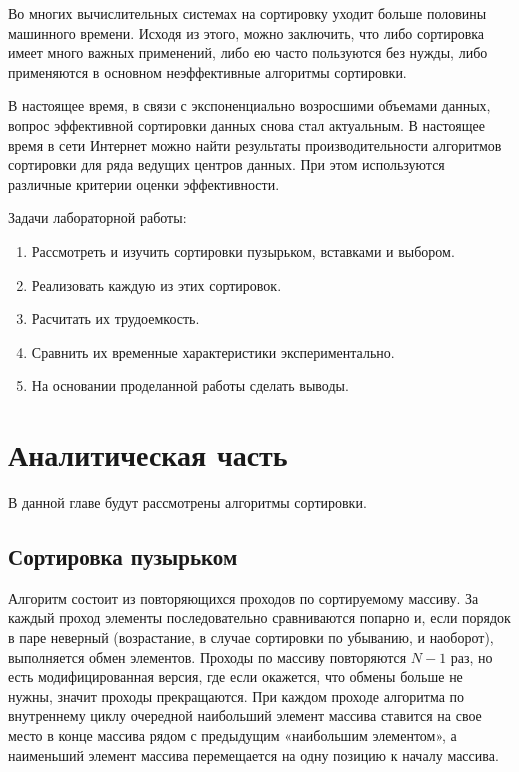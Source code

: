 \documentclass[a4paper,14pt, unknownkeysallowed]{extreport}
\begin{document}
Во многих вычислительных системах на сортировку уходит больше половины машинного времени. Исходя из этого, можно заключить, что либо сортировка имеет много важных применений, либо ею часто пользуются без нужды, либо применяются в основном неэффективные алгоритмы сортировки.

В настоящее время, в связи с экспоненциально возросшими объемами данных, вопрос эффективной сортировки данных снова стал актуальным. В настоящее время в сети Интернет можно найти результаты производительности алгоритмов сортировки для ряда ведущих центров данных.
При этом используются различные критерии оценки эффективности. 

Задачи лабораторной работы:

\begin{enumerate}
    \item Рассмотреть и изучить сортировки пузырьком, вставками и выбором.
    \item Реализовать каждую из этих сортировок.
    \item Расчитать их трудоемкость.
    \item Сравнить их временные характеристики экспериментально.
    \item На основании проделанной работы сделать выводы.
\end{enumerate}

\chapter{Аналитическая часть}
В данной главе будут рассмотрены алгоритмы сортировки.

\section{Сортировка пузырьком}


Алгоритм состоит из повторяющихся проходов по сортируемому массиву. За каждый проход элементы последовательно сравниваются попарно и, если порядок в паре неверный (возрастание, в случае сортировки по убыванию, и наоборот), выполняется обмен элементов. Проходы по массиву повторяются $N - 1$ раз, но есть модифицированная версия, где если окажется, что обмены больше не нужны, значит проходы прекращаются. При каждом проходе алгоритма по внутреннему циклу очередной наибольший элемент массива ставится на свое место в конце массива рядом с предыдущим «наибольшим элементом», а наименьший элемент массива перемещается на одну позицию к началу массива.
\end{document}
